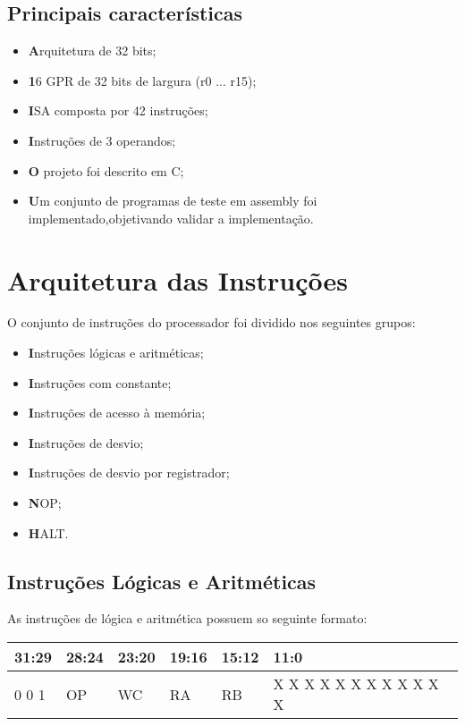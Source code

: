 \documentclass{report}
\begin{document}
\section{Principais características}
\begin{itemize}
    \item \textbf Arquitetura de 32 bits;
    \item \textbf 16 GPR de 32 bits de largura (r0 ... r15);
    \item \textbf ISA composta por 42 instruções;
    \item \textbf Instruções de 3 operandos;
    \item \textbf O projeto foi descrito em C;
    \item \textbf Um conjunto de programas de teste em assembly foi implementado,objetivando validar a implementação.
\end{itemize}

\newpage
\chapter{Arquitetura das Instruções}
O conjunto de instruções do processador foi dividido nos seguintes grupos:\newline
\begin{itemize}
 \item \textbf Instruções lógicas e aritméticas;
 \item \textbf Instruções com constante;
 \item \textbf Instruções de acesso à memória;
 \item \textbf Instruções de desvio;
 \item \textbf Instruções de desvio por registrador;
 \item \textbf NOP;
 \item \textbf HALT.
\end{itemize}

\section{Instruções Lógicas e Aritméticas}
As instruções de lógica e aritmética possuem so seguinte formato:

   \FloatBarrier
    \begin{table}[H]
      \begin{center}
        \begin{tabular}[pos]{|m{2cm}|m{2cm}|m{2cm}|m{2cm}|m{2cm}|m{4cm}|} 
          \hline
          \cellcolor[gray]{0.9}\textbf{31:29} & \cellcolor[gray]{0.9}\textbf{28:24} &
          \cellcolor[gray]{0.9}\textbf{23:20} &
          \cellcolor[gray]{0.9}\textbf{19:16} &
          \cellcolor[gray]{0.9}\textbf{15:12} &
          \cellcolor[gray]{0.9}\textbf{11:0} \\ \hline
            0 0 1 & OP & WC & RA & RB & X X X X X X X X X X X X \\ \hline
        \end{tabular}
      \end{center}
    \end{table}  
\end{document}
